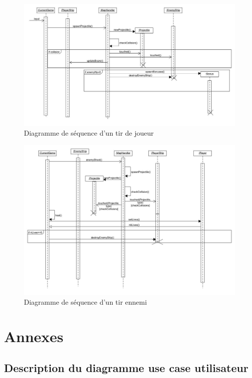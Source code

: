 \documentclass[a4paper,12pt]{article}
\begin{document}
\begin{figure}[hbtp]
\centering
\includegraphics[scale=0.3]{images/player_shooting.jpg}
\caption{Diagramme de séquence d'un tir de joueur}
\end{figure}


\begin{figure}[hbtp]
\centering
\includegraphics[scale=0.3]{images/enemy_shooting.jpg}
\caption{Diagramme de séquence d'un tir ennemi }
\end{figure}

\newpage
\section{Annexes}
\subsection{ Description du diagramme use case utilisateur}
\end{document}
